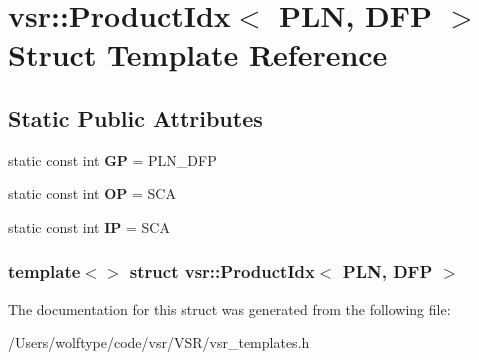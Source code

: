 \hypertarget{structvsr_1_1_product_idx_3_01_p_l_n_00_01_d_f_p_01_4}{\section{vsr\-:\-:Product\-Idx$<$ P\-L\-N, D\-F\-P $>$ Struct Template Reference}
\label{structvsr_1_1_product_idx_3_01_p_l_n_00_01_d_f_p_01_4}
}
\subsection*{Static Public Attributes}
\begin{DoxyCompactItemize}
\item 
\hypertarget{structvsr_1_1_product_idx_3_01_p_l_n_00_01_d_f_p_01_4_ad895e4d0c9c9ec0ad8c0aca49f7144ec}{static const int {\bfseries G\-P} = P\-L\-N\-\_\-\-D\-F\-P}\label{structvsr_1_1_product_idx_3_01_p_l_n_00_01_d_f_p_01_4_ad895e4d0c9c9ec0ad8c0aca49f7144ec}

\item 
\hypertarget{structvsr_1_1_product_idx_3_01_p_l_n_00_01_d_f_p_01_4_a2e02afa2c359b552ed8afe60227026a9}{static const int {\bfseries O\-P} = S\-C\-A}\label{structvsr_1_1_product_idx_3_01_p_l_n_00_01_d_f_p_01_4_a2e02afa2c359b552ed8afe60227026a9}

\item 
\hypertarget{structvsr_1_1_product_idx_3_01_p_l_n_00_01_d_f_p_01_4_a266f1fb5dfaa344261746a89c711a785}{static const int {\bfseries I\-P} = S\-C\-A}\label{structvsr_1_1_product_idx_3_01_p_l_n_00_01_d_f_p_01_4_a266f1fb5dfaa344261746a89c711a785}

\end{DoxyCompactItemize}
\subsubsection*{template$<$$>$ struct vsr\-::\-Product\-Idx$<$ P\-L\-N, D\-F\-P $>$}



The documentation for this struct was generated from the following file\-:\begin{DoxyCompactItemize}
\item 
/\-Users/wolftype/code/vsr/\-V\-S\-R/vsr\-\_\-templates.\-h\end{DoxyCompactItemize}
